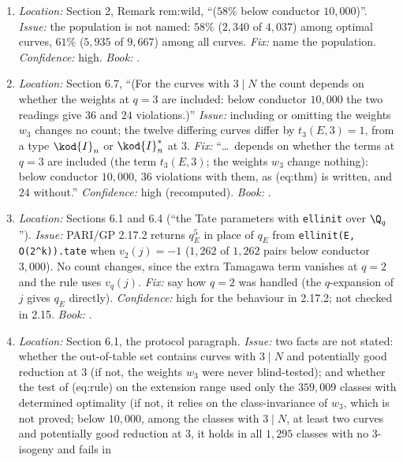 \begin{sloppypar}
\begin{enumerate}[resume*=errata]
\emph{Fix:} ``Among all curves of conductor below $10{,}000$, every cubic factor at $2$ ($1{,}143$) and at $3$ ($2{,}283$) equals the formula of (ii) for a twist of good reduction found independently ($534$
and $1{,}308$ among the optimal non-CM curves).'' \emph{Confidence:} high. \emph{Book:} .
\item\label{err:paper:58} \emph{Location:} Section 2, Remark rem:wild, ``($58\%$ below conductor $10{,}000$)''. \emph{Issue:} the population is not named: $58\%$ ($2{,}340$ of $4{,}037$) among optimal curves, $61\%$
($5{,}935$ of $9{,}667$) among all curves. \emph{Fix:} name the population. \emph{Confidence:} high. \emph{Book:} .
\item\label{err:paper:36-24} \emph{Location:} Section 6.7, ``(For the curves with $3\mid N$ the count depends on whether the weights at $q=3$ are included: below conductor $10{,}000$ the two readings give $36$ and
$24$ violations.)'' \emph{Issue:} including or omitting the weights $w_3$ changes no count; the twelve differing curves differ by $t_3(E,3)=1$, from a type $\kod{I}_n$ or $\kod{I}_n^*$ at $3$. \emph{Fix:} ``\dots\
depends on whether the terms at $q=3$ are included (the term $t_3(E,3)$; the weights $w_3$ change nothing): below conductor $10{,}000$, $36$ violations with them, as (eq:thm) is written, and $24$
without.'' \emph{Confidence:} high (recomputed). \emph{Book:} \Cref{ch:computation}.
\item\label{err:paper:tate-two} \emph{Location:} Sections 6.1 and 6.4 (``the Tate parameters with \texttt{ellinit} over $\Q_q$''). \emph{Issue:} PARI/GP 2.17.2 returns $q_E^5$ in place of $q_E$ from \texttt{ellinit(E, O(2\^{}k)).tate}
when $v_2(j)=-1$ ($1{,}262$ of $1{,}262$ pairs below conductor $3{,}000$). No count changes, since the extra Tamagawa term vanishes at $q=2$ and the rule uses $v_q(j)$. \emph{Fix:} say how $q=2$ was handled
(the $q$-expansion of $j$ gives $q_E$ directly). \emph{Confidence:} high for the behaviour in 2.17.2; not checked in 2.15. \emph{Book:} \Cref{ch:reduction,ch:computation}.
\item\label{err:paper:protocol} \emph{Location:} Section 6.1, the protocol paragraph. \emph{Issue:} two facts are not stated: whether the out-of-table set contains curves with $3\mid N$ and potentially good
reduction at $3$ (if not, the weights $w_3$ were never blind-tested); and whether the test of (eq:rule) on the extension range used only the $359{,}009$ classes with determined optimality (if
not, it relies on the class-invariance of $w_3$, which is not proved; below $10{,}000$, among the classes with $3\mid N$, at least two curves and potentially good reduction at $3$, it holds in all $1{,}295$ classes with no $3$-isogeny and fails in

\end{enumerate}
\end{sloppypar}
